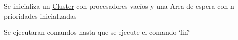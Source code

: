 \textbullet{} Se inicializa un \mbox{\hyperlink{classCluster}{Cluster}} con procesadores vacíos y una Area de espera con n prioridades inicializadas

\textbullet{} Se ejecutaran comandos hasta que se ejecute el comando \char`\"{}fin\char`\"{} 
